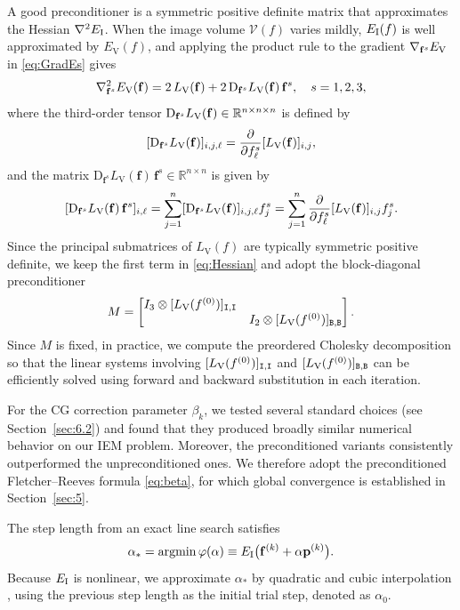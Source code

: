 \documentclass[11pt,a4paper]{article}
\def\rV{\mathrm{V}}
\begin{document}
A good preconditioner is a symmetric positive definite matrix that approximates the Hessian $\nabla^2 E_{\mathrm{I}}$. When the image volume $\mathcal{V}(f)$ varies mildly, $E_{\mathrm{I}}(f)$ is well approximated by $E_\mathrm{V}(f)$, and applying the product rule to the gradient $\nabla_{\mathbf{f}^s} E_\mathrm{V}$ in \eqref{eq:GradEs} gives
\begin{equation}
\nabla^2_{\f^s} E_\mathrm{V} (\f) = 2\,L_\rV(\f)  + 2 \,\mathrm{D}_{\f^s} L_\rV(\f) \, \f^s, \quad s = 1,2,3,
\label{eq:Hessian}
\end{equation}
where the third-order tensor $\mathrm{D}_{\f^s} L_\rV(\f) \in \mathbb{R}^{n\times n\times n}$ is defined by
$$
[\mathrm{D}_{\f^s} L_\rV(\f)]_{i,j,\ell} = \frac{\partial}{\partial f_\ell^s}[L_\rV(\f)]_{i,j},
$$
and the matrix $\mathrm{D}_{\mathbf f^s}L_{\mathrm V}(\mathbf f)\,\mathbf f^s\in\mathbb{R}^{n\times n}$ is given by 
$$
[\mathrm{D}_{\f^s} L_\rV(\f) \,\f^s]_{i,\ell}
= \sum_{j=1}^n [\mathrm{D}_{\f^s} L_\rV(\f)]_{i,j,\ell} f_j^s
=\sum_{j=1}^n \frac{\partial}{\partial f_\ell^s}[L_\rV(\f)]_{i,j} f_j^s.
$$
Since the principal submatrices of $L_\rV(f)$ are typically symmetric positive definite, we keep the first term in \eqref{eq:Hessian} and adopt the block-diagonal preconditioner
\begin{equation}
M = \begin{bmatrix}
I_3 \otimes [L_\rV(f^{(0)})]_{\I,\I} \\
& I_2 \otimes [L_\rV(f^{(0)})]_{\B,\B}
\end{bmatrix}.
\label{eq:precond}
\end{equation}
Since $M$ is fixed, in practice, we compute the preordered Cholesky decomposition so that the linear systems involving $[L_\rV(f^{(0)})]_{\I, \I}$ and $[L_\rV(f^{(0)})]_{\B, \B}$ can be efficiently solved using forward and backward substitution in each iteration.


For the CG correction parameter $\beta_k$, we tested several standard choices (see Section~\ref{sec:6.2}) and found that they produced broadly similar numerical behavior on our IEM problem. Moreover, the preconditioned variants consistently outperformed the unpreconditioned ones. We therefore adopt the preconditioned Fletcher--Reeves formula \eqref{eq:beta}, for which global convergence is established in Section~\ref{sec:5}.





The step length from an exact line search satisfies
\[
\alpha_* = \argmin \varphi(\alpha) \equiv E_{\rI} \big(\f^{(k)} +\alpha \p^{(k)} \big).
\]
Because $E_{\mathrm{I}}$ is nonlinear, we approximate $\alpha_*$ by quadratic and cubic interpolation \cite[Chapter~3.5]{NoWr06}, using the previous step length as the initial trial step, denoted as $\alpha_0$. 
\end{document}
